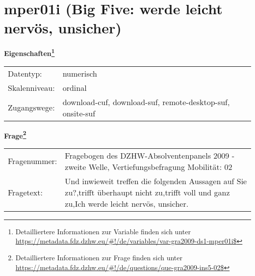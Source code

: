 
    \setcounter{footnote}{0}

    \vspace*{-1.8cm}
	\section{mper01i (Big Five: werde leicht nervös, unsicher)}
	\label{section:mper01i}



    \vspace*{0.5cm}
    \noindent\textbf{Eigenschaften\footnote{Detailliertere Informationen zur Variable finden sich unter
		\url{https://metadata.fdz.dzhw.eu/\#!/de/variables/var-gra2009-ds1-mper01i$}}}\\
	\begin{tabularx}{\hsize}{@{}lX}
	Datentyp: & numerisch \\
	Skalenniveau: & ordinal \\
	Zugangswege: &
	  download-cuf, 
	  download-suf, 
	  remote-desktop-suf, 
	  onsite-suf
 \\
    \end{tabularx}



				\vspace*{0.5cm}
                \noindent\textbf{Frage\footnote{Detailliertere Informationen zur Frage finden sich unter
		              \url{https://metadata.fdz.dzhw.eu/\#!/de/questions/que-gra2009-ins5-02$}}}\\
				\begin{tabularx}{\hsize}{@{}lX}
					Fragenummer: &
					  Fragebogen des DZHW-Absolventenpanels 2009 - zweite Welle, Vertiefungsbefragung Mobilität:
					  02
 \\
					Fragetext: & Und inwieweit treffen die folgenden Aussagen auf Sie zu?,trifft überhaupt nicht zu,trifft voll und ganz zu,Ich werde leicht nervös, unsicher. \\
				\end{tabularx}





